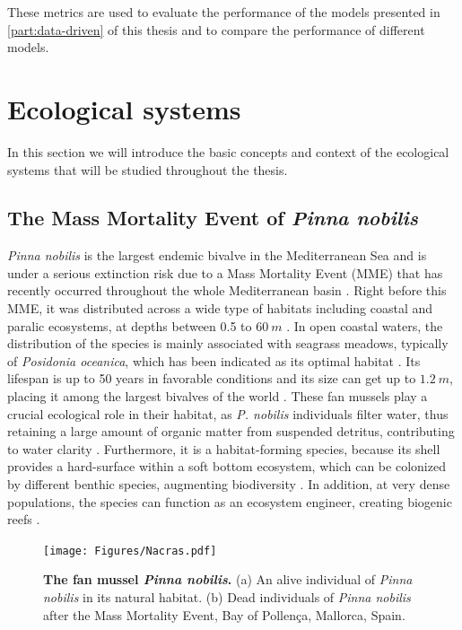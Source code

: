 These metrics are used to evaluate the performance of the models presented in
\cref{part:data-driven} of this thesis and to compare the performance of
different models.

\section{\label{sec:Ecological systems} Ecological
  systems}

In this section we will introduce the basic concepts and context of the
ecological systems that will be studied throughout the thesis.

\subsection{\label{sec:The Mass Mortality Event of Pinna nobilis} The Mass
  Mortality Event of \textit{Pinna nobilis}}

\textit{Pinna nobilis} is the largest endemic bivalve in the Mediterranean
Sea and is under a serious extinction risk due to a Mass Mortality Event (MME)
that has recently occurred throughout the whole Mediterranean basin
\cite{March, ZOTOU2020, VAZQUEZ2017}. Right before this
MME, it was distributed across a wide type of habitats including coastal and
paralic ecosystems, at depths between 0.5 to $\SI{60}{m}$
\cite{butler1993ecology, PRADO2020105220}. In open coastal waters, the
distribution of the species is mainly associated with seagrass meadows,
typically of \textit{Posidonia oceanica}, which has been indicated as its
optimal habitat \cite{Hendriks2011}. Its lifespan is up to 50 years in
favorable conditions and its size can get up to $\SI{1.2}{m}$, placing it
among the largest bivalves of the  world \cite{Cabanellas2019}. These fan
mussels play a crucial ecological role in their habitat, as \textit{P.
  nobilis}
individuals filter water, thus retaining a large amount of organic matter
from
suspended detritus, contributing to water clarity \cite{TRIGOS2014}.
Furthermore, it is a habitat-forming species, because its shell provides a
hard-surface within a soft bottom ecosystem, which can be colonized by
different benthic species, augmenting biodiversity \cite{Cabanellas2019}. In
addition, at very dense populations, the species can function as an ecosystem
engineer, creating biogenic reefs \cite{katsanevakis2016transplantation}.

\begin{figure}[H]
  \centering
  \texttt{[image: Figures/Nacras.pdf]}
  \caption[The fan mussel \textit{Pinna nobilis}]{
    \textbf{The fan mussel \textit{Pinna nobilis}.} (a) An alive individual
    of
    \textit{Pinna nobilis} in its natural habitat. (b) Dead individuals of
    \textit{Pinna nobilis} after the Mass Mortality Event, Bay of Pollença,
    Mallorca, Spain.}
  \label{fig:Pinna_nobilis}
\end{figure}

